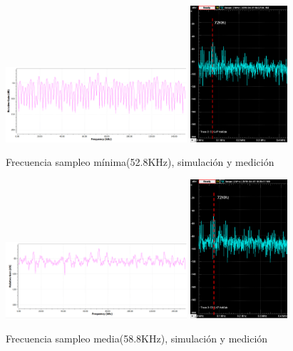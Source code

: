 \documentclass[../../ASSD_TP1_G7.tex]{subfiles}
\begin{document}
\begin{figure}[H]
\centering
{}
{\includegraphics[width=0.6\textwidth]{figures/simpto_8_llave_52,8khz_espectro.png}}
{\includegraphics[width=0.32\textwidth]{figures/pto_8_llave_52,8khz_espectro.png}}
\caption{Frecuencia sampleo mínima(52.8KHz), simulación y medición}
\end{figure}

\begin{figure}[H]
\centering
{}
{\includegraphics[width=0.6\textwidth]{figures/simpto_8_llave_58,8_espectro.png}}
{\includegraphics[width=0.32\textwidth]{figures/pto_8_llave_58,8_espectro.png}}
\caption{Frecuencia sampleo media(58.8KHz), simulación y medición}
\end{figure}
\end{document}
